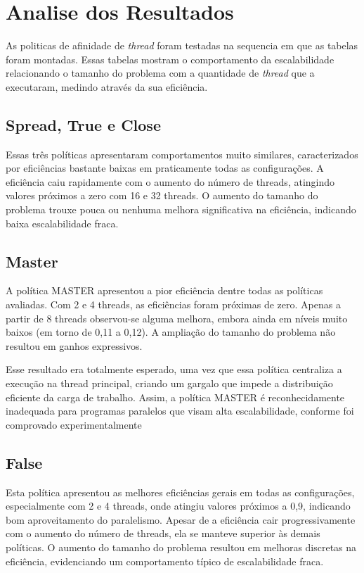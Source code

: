 \documentclass[a4paper, 12pt]{article}
\begin{document}
	\section{Analise dos Resultados}
	
	As politicas de afinidade de \textit{thread} foram testadas na sequencia em que as tabelas foram montadas. Essas tabelas mostram o comportamento da escalabilidade relacionando o tamanho do problema com a quantidade de \textit{thread} que a executaram, medindo através da sua eficiência.
	
	\subsection{Spread, True e Close}
	Essas três políticas apresentaram comportamentos muito similares, caracterizados por eficiências bastante baixas em praticamente todas as configurações. A eficiência caiu rapidamente com o aumento do número de threads, atingindo valores próximos a zero com 16 e 32 threads. O aumento do tamanho do problema trouxe pouca ou nenhuma melhora significativa na eficiência, indicando baixa escalabilidade fraca.
	
	\subsection{Master}
	A política MASTER apresentou a pior eficiência dentre todas as políticas avaliadas. Com 2 e 4 threads, as eficiências foram próximas de zero. Apenas a partir de 8 threads observou-se alguma melhora, embora ainda em níveis muito baixos (em torno de 0,11 a 0,12). A ampliação do tamanho do problema não resultou em ganhos expressivos.
	
	Esse resultado era totalmente esperado, uma vez que essa política centraliza a execução na thread principal, criando um gargalo que impede a distribuição eficiente da carga de trabalho. Assim, a política MASTER é reconhecidamente inadequada para programas paralelos que visam alta escalabilidade, conforme foi comprovado experimentalmente
	
	\subsection{False}
	Esta política apresentou as melhores eficiências gerais em todas as configurações, especialmente com 2 e 4 threads, onde atingiu valores próximos a 0,9, indicando bom aproveitamento do paralelismo. Apesar de a eficiência cair progressivamente com o aumento do número de threads, ela se manteve superior às demais políticas. O aumento do tamanho do problema resultou em melhoras discretas na eficiência, evidenciando um comportamento típico de escalabilidade fraca.
	
\end{document}
